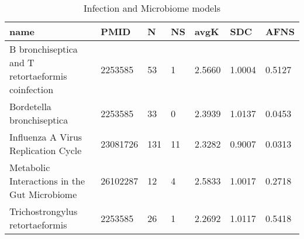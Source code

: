 \begin{table}
\centering
\caption{Infection and Microbiome models}
\label{tab:Infection_and_Microbiome}
\begin{tabular}{|p{180pt}||p{40pt}|p{25pt}|p{25pt}|p{40pt}|p{25pt}|p{25pt}|}
\toprule
 name & PMID & N &NS & avgK &SDC & AFNS \\
\midrule
B bronchiseptica and T retortaeformis coinfection & 2253585 & 53 & 1 & 2.5660 & 1.0004 & 0.5127 \\
Bordetella bronchiseptica & 2253585 & 33 & 0 & 2.3939 & 1.0137 & 0.0453 \\
Influenza A Virus Replication Cycle & 23081726 & 131 & 11 & 2.3282 & 0.9007 & 0.0313 \\
Metabolic Interactions in the Gut Microbiome & 26102287 & 12 & 4 & 2.5833 & 1.0017 & 0.2718 \\
Trichostrongylus retortaeformis & 2253585 & 26 & 1 & 2.2692 & 1.0117 & 0.5418 \\
\bottomrule
\end{tabular}
\end{table}
